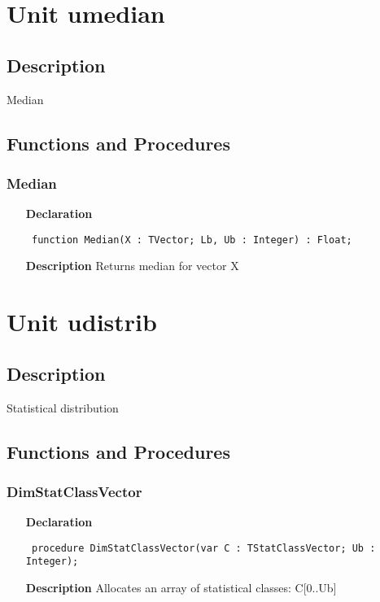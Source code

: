 \documentclass[12pt,a4paper,oneside]{report}
\newcommand{\declarationitem}[1]{\textbf{#1}}
\newcommand{\descriptiontitle}[1]{\textbf{#1}}
\newcommand{\code}[1]{\texttt{#1}}
\begin{document}
\section{Unit umedian}
\label{umedian}
\subsection{Description}
Median 
\subsection{Functions and Procedures}
\subsubsection{Median}
\label{umedian-Median}
\begin{itemize}\item[\declarationitem{Declaration}\hfill]
	\begin{flushleft}
		\code{
			function Median(X : TVector; Lb, Ub : Integer) : Float;}
	\end{flushleft}
	\item[\descriptiontitle{Description}]
	Returns median for vector X
\end{itemize}
\section{Unit udistrib}
\label{udistrib}
\subsection{Description}
Statistical distribution 
\subsection{Functions and Procedures}
\subsubsection{DimStatClassVector}
\label{udistrib-DimStatClassVector}
\begin{itemize}\item[\declarationitem{Declaration}\hfill]
	\begin{flushleft}
		\code{
			procedure DimStatClassVector(var C : TStatClassVector; Ub : Integer);}
	\end{flushleft}
	\item[\descriptiontitle{Description}]
	Allocates an array of statistical classes: C[0..Ub]
\end{itemize}
\end{document}
